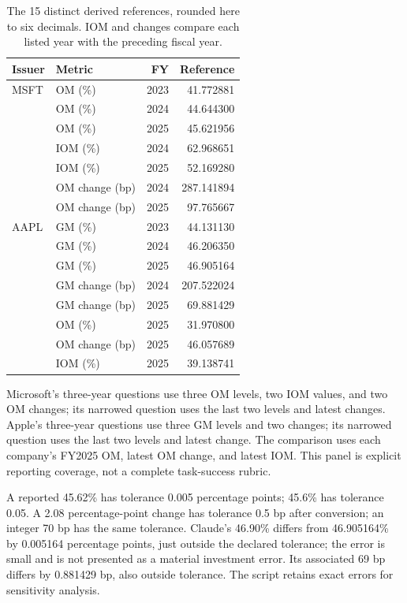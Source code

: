\documentclass[letterpaper]{article} %
\begin{document}
\begin{table}[t]
\centering
\begin{tabular}{llrr}
\toprule
Issuer & Metric & FY & Reference\\
\midrule
MSFT & OM (\%) & 2023 & 41.772881\\
 & OM (\%) & 2024 & 44.644300\\
 & OM (\%) & 2025 & 45.621956\\
 & IOM (\%) & 2024 & 62.968651\\
 & IOM (\%) & 2025 & 52.169280\\
 & OM change (bp) & 2024 & 287.141894\\
 & OM change (bp) & 2025 & 97.765667\\
AAPL & GM (\%) & 2023 & 44.131130\\
 & GM (\%) & 2024 & 46.206350\\
 & GM (\%) & 2025 & 46.905164\\
 & GM change (bp) & 2024 & 207.522024\\
 & GM change (bp) & 2025 & 69.881429\\
 & OM (\%) & 2025 & 31.970800\\
 & OM change (bp) & 2025 & 46.057689\\
 & IOM (\%) & 2025 & 39.138741\\
\bottomrule
\end{tabular}
\caption{The 15 distinct derived references, rounded here to six decimals. IOM and changes compare each listed year with the preceding fiscal year.}
\label{tab:gold}
\end{table}

Microsoft's three-year questions use three OM levels, two IOM values, and two OM changes; its narrowed question uses the last two levels and latest changes. Apple's three-year questions use three GM levels and two changes; its narrowed question uses the last two levels and latest change. The comparison uses each company's FY2025 OM, latest OM change, and latest IOM. This panel is explicit reporting coverage, not a complete task-success rubric.

A reported 45.62\% has tolerance 0.005 percentage points; 45.6\% has tolerance 0.05. A 2.08 percentage-point change has tolerance 0.5 bp after conversion; an integer 70 bp has the same tolerance. Claude's 46.90\% differs from 46.905164\% by 0.005164 percentage points, just outside the declared tolerance; the error is small and is not presented as a material investment error. Its associated 69 bp differs by 0.881429 bp, also outside tolerance. The script retains exact errors for sensitivity analysis.
\end{document}
